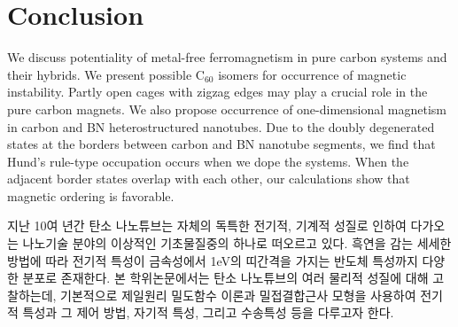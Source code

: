 \documentclass[doctor,english,final]{kaist-ucs}
\begin{document}
\chapter{Conclusion}

We discuss potentiality of metal-free ferromagnetism
in pure carbon systems and their hybrids.
We present possible C$_{60}$ isomers for occurrence of magnetic
instability.
Partly open cages with zigzag edges may play a crucial role in
the pure carbon magnets.
We also propose occurrence of one-dimensional magnetism in carbon and
BN heterostructured nanotubes.
Due to the doubly degenerated states at the borders between
carbon and BN nanotube segments, we find that Hund's rule-type
occupation occurs when we dope the systems.
When the adjacent border states overlap with each other,
our calculations show that magnetic ordering is favorable.


%
%
%
%
%
%
%




\begin{summary}

    지난 10여 년간 탄소 나노튜브는 자체의 독특한 전기적, 기계적 성질로
    인하여 다가오는 나노기술 분야의 이상적인 기초물질중의 하나로 떠오르고
    있다. 흑연을 감는 세세한 방법에 따라 전기적 특성이 금속성에서 1eV의
    띠간격을 가지는 반도체 특성까지 다양한 분포로 존재한다.
    본 학위논문에서는 탄소 나노튜브의 여러 물리적 성질에 대해 고찰하는데,
    기본적으로 제일원리 밀도함수 이론과 밀접결합근사 모형을 사용하여 전기적
    특성과 그 제어 방법, 자기적 특성, 그리고 수송특성 등을 다루고자 한다.

\end{summary}
\end{document}
